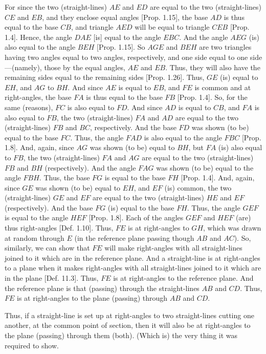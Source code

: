 \begin{Parallel}{}{}
{For since the two (straight-lines) $AE$ and $ED$ are equal to the two (straight-lines) $CE$ and $EB$, and they  enclose equal angles [Prop. 1.15], the base $AD$ is thus equal to the
base $CB$, and triangle $AED$ will be equal to triangle $CEB$ [Prop. 1.4]. Hence, the angle $DAE$ [is] equal to
the angle $EBC$. And the angle $AEG$ (is)  also equal to the angle
$BEH$ [Prop. 1.15]. So $AGE$ and $BEH$
are two triangles having two angles equal to two angles, respectively, and
one side equal to one side---(namely), those by the equal angles, $AE$ and $EB$. Thus, they will also have the remaining sides equal to the remaining
sides [Prop. 1.26]. Thus, $GE$ (is) equal to $EH$, 
and $AG$ to $BH$. And since $AE$ is equal to $EB$, and $FE$ is
common and at right-angles, the base $FA$ is thus equal to the base $FB$ [Prop. 1.4]. So, for the same (reasons), $FC$ is also
equal to $FD$. And since $AD$ is equal to $CB$, and $FA$ is also equal to
$FB$, the two (straight-lines) $FA$ and $AD$ are equal to the
two (straight-lines) $FB$ and $BC$, respectively. And the base $FD$
was shown (to be) equal to the base $FC$. Thus, the angle $FAD$ is also
equal to the angle $FBC$ [Prop. 1.8]. And, again,
since $AG$ was shown (to be) equal to $BH$, but $FA$ (is) also equal to
$FB$, the two (straight-lines) $FA$ and $AG$ are equal to the
two (straight-lines) $FB$ and $BH$ (respectively). And the angle $FAG$
was shown (to be) equal to the angle $FBH$. Thus, the base $FG$ is equal
to the base $FH$ [Prop. 1.4]. And, again, since
$GE$ was shown (to be) equal to $EH$, and $EF$ (is) common, the two
(straight-lines) $GE$ and $EF$ are equal to the two (straight-lines)
$HE$ and $EF$ (respectively). And the base $FG$
(is) equal to the base $FH$. Thus, the angle $GEF$ is equal to the
angle $HEF$ [Prop. 1.8]. Each of the
angles $GEF$ and $HEF$ (are) thus right-angles [Def. 1.10]. Thus, $FE$ is
at right-angles to $GH$, which was drawn at random through $E$ (in the reference plane passing though $AB$ and $AC$). So, similarly, we can show that
$FE$ will make right-angles with all straight-lines joined to it which are in the reference plane. And a straight-line is at right-angles
to a plane when it makes right-angles with all straight-lines joined to
it which are in the plane [Def. 11.3]. Thus,
$FE$ is at right-angles to the reference plane. And the reference plane
is that (passing) through the straight-lines $AB$ and $CD$. Thus,
$FE$ is at right-angles to the plane (passing) through $AB$ and
$CD$.

Thus, if a straight-line is set up at right-angles to two straight-lines cutting one another, at the common point of section, then it will also be
at right-angles to the plane (passing) through them (both). (Which is)
the very thing it was required to show.}
\end{Parallel}

